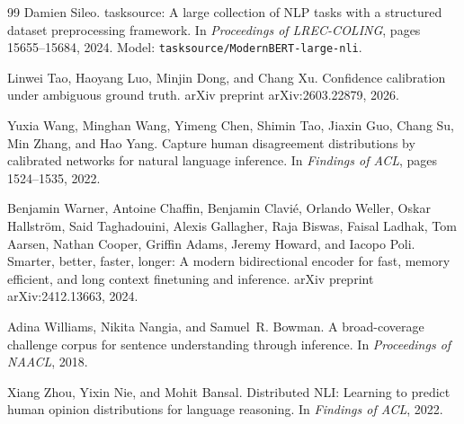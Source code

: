 \documentclass[11pt,a4paper]{article}
\begin{document}
\begin{thebibliography}{99}
Damien Sileo.
\newblock tasksource: A large collection of NLP tasks with a structured dataset preprocessing framework.
\newblock In {\em Proceedings of LREC-COLING}, pages 15655--15684, 2024.
\newblock Model: \texttt{tasksource/ModernBERT-large-nli}.

Linwei Tao, Haoyang Luo, Minjin Dong, and Chang Xu.
\newblock Confidence calibration under ambiguous ground truth.
\newblock arXiv preprint arXiv:2603.22879, 2026.

Yuxia Wang, Minghan Wang, Yimeng Chen, Shimin Tao, Jiaxin Guo, Chang Su, Min Zhang, and Hao Yang.
\newblock Capture human disagreement distributions by calibrated networks for natural language inference.
\newblock In {\em Findings of ACL}, pages 1524--1535, 2022.

Benjamin Warner, Antoine Chaffin, Benjamin Clavi\'e, Orlando Weller, Oskar Hallstr\"om, Said Taghadouini, Alexis Gallagher, Raja Biswas, Faisal Ladhak, Tom Aarsen, Nathan Cooper, Griffin Adams, Jeremy Howard, and Iacopo Poli.
\newblock Smarter, better, faster, longer: A modern bidirectional encoder for fast, memory efficient, and long context finetuning and inference.
\newblock arXiv preprint arXiv:2412.13663, 2024.

Adina Williams, Nikita Nangia, and Samuel~R. Bowman.
\newblock A broad-coverage challenge corpus for sentence understanding through inference.
\newblock In {\em Proceedings of NAACL}, 2018.

Xiang Zhou, Yixin Nie, and Mohit Bansal.
\newblock Distributed NLI: Learning to predict human opinion distributions for language reasoning.
\newblock In {\em Findings of ACL}, 2022.

\end{thebibliography}
\end{document}
